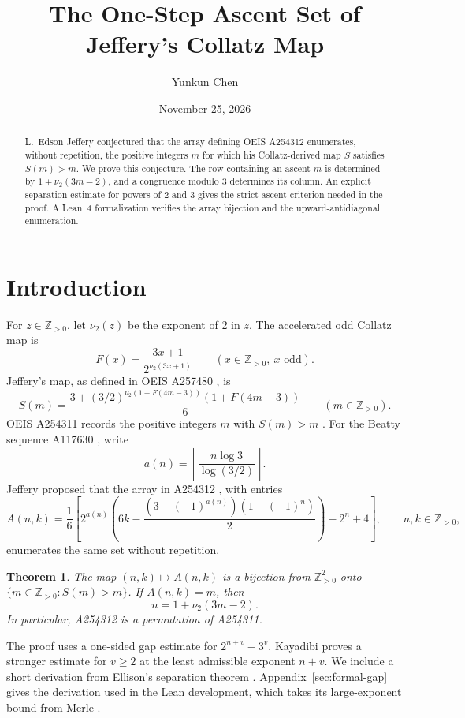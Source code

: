 \documentclass[11pt,a4paper]{amsart}
\title[The ascent set of Jeffery's Collatz map]
  {The One-Step Ascent Set of Jeffery's Collatz Map}
\author{Yunkun Chen}
\date{November 25, 2026}
\newtheorem{theorem}{Theorem}[section]
\newcommand{\Npos}{\mathbb{Z}_{>0}}
\begin{document}
\begin{abstract}
L.~Edson Jeffery conjectured that the array defining OEIS A254312
enumerates, without repetition, the positive integers \(m\) for which his
Collatz-derived map \(S\) satisfies \(S(m)>m\). We prove this conjecture.
The row containing an ascent \(m\) is determined by
\(1+\nu_2(3m-2)\), and a congruence modulo \(3\) determines its column.
An explicit separation estimate for powers of \(2\) and \(3\) gives the
strict ascent criterion needed in the proof. A Lean~4 formalization
verifies the array bijection and the upward-antidiagonal enumeration.
\end{abstract}

\maketitle

\section{Introduction}

For \(z\in\Npos\), let \(\nu_2(z)\) be the exponent of \(2\) in \(z\).
The accelerated odd Collatz map is
\[
  F(x)=\frac{3x+1}{2^{\nu_2(3x+1)}}\qquad (x\in\Npos,\ x\text{ odd}).
\]
Jeffery's map, as defined in OEIS A257480 \cite{jeffery-map}, is
\begin{equation}\label{eq:step}
  S(m)=\frac{3+(3/2)^{\nu_2(1+F(4m-3))}(1+F(4m-3))}{6}
  \qquad(m\in\Npos).
\end{equation}
OEIS A254311 records the positive integers \(m\) with \(S(m)>m\)
\cite{jeffery-ascents}. For the Beatty sequence A117630 \cite{beatty},
write
\[
 a(n)=\left\lfloor\frac{n\log 3}{\log(3/2)}\right\rfloor.
\]
Jeffery proposed that the array in A254312 \cite{jeffery-array}, with
entries
\begin{equation}\label{eq:array}
 A(n,k)=\frac{1}{6}
 \left[
  2^{a(n)}\left(6k-\frac{(3-(-1)^{a(n)})(1-(-1)^n)}{2}\right)
  -2^n+4
 \right],\qquad n,k\in\Npos,
\end{equation}
enumerates the same set without repetition.

\begin{theorem}\label{thm:main}
The map \((n,k)\mapsto A(n,k)\) is a bijection from
\(\Npos^2\) onto \(\{m\in\Npos:S(m)>m\}\). If \(A(n,k)=m\), then
\[
 n=1+\nu_2(3m-2).
\]
In particular, A254312 is a permutation of A254311.
\end{theorem}

The proof uses a one-sided gap estimate for \(2^{n+v}-3^v\).
Kayadibi \cite[Theorem~6.2]{kayadibi} proves a stronger estimate for
\(v\ge2\) at the least admissible exponent \(n+v\).
We include a short derivation from Ellison's separation theorem
\cite[Theorem~3]{ellison}. Appendix~\ref{sec:formal-gap} gives the
derivation used in the Lean development, which takes its
large-exponent bound from Merle \cite{merle}.
\end{document}
